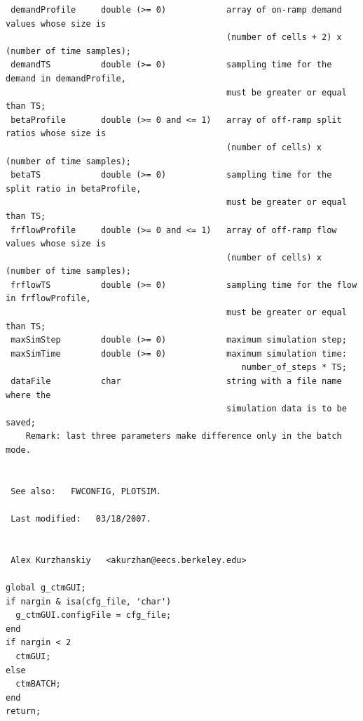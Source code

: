 \documentclass[UTF8,12.05pt]{ctexart}
\begin{document}
\begin{lstlisting}
 demandProfile     double (>= 0)            array of on-ramp demand values whose size is
                                            (number of cells + 2) x (number of time samples);
 demandTS          double (>= 0)            sampling time for the demand in demandProfile,
                                            must be greater or equal than TS;
 betaProfile       double (>= 0 and <= 1)   array of off-ramp split ratios whose size is
                                            (number of cells) x (number of time samples);
 betaTS            double (>= 0)            sampling time for the split ratio in betaProfile,
                                            must be greater or equal than TS;
 frflowProfile     double (>= 0 and <= 1)   array of off-ramp flow values whose size is
                                            (number of cells) x (number of time samples);
 frflowTS          double (>= 0)            sampling time for the flow in frflowProfile,
                                            must be greater or equal than TS;
 maxSimStep        double (>= 0)            maximum simulation step;
 maxSimTime        double (>= 0)            maximum simulation time:
                                               number_of_steps * TS;
 dataFile          char                     string with a file name where the
                                            simulation data is to be saved;
    Remark: last three parameters make difference only in the batch mode.


 See also:   FWCONFIG, PLOTSIM.

 Last modified:   03/18/2007.


 Alex Kurzhanskiy   <akurzhan@eecs.berkeley.edu>

global g_ctmGUI;
if nargin & isa(cfg_file, 'char')
  g_ctmGUI.configFile = cfg_file;
end
if nargin < 2
  ctmGUI;
else
  ctmBATCH;
end
return;

\end{lstlisting}
\end{document}
